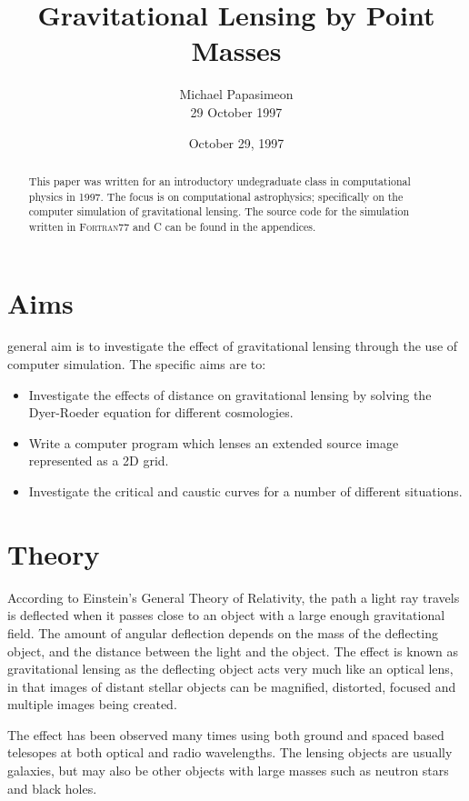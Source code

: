 \documentclass[a4paper]{IEEEtran}
\title{Gravitational Lensing by Point Masses}
\author{Michael Papasimeon\\29 October 1997}
\date{October 29, 1997}
\begin{document}
\maketitle

\begin{abstract} 
This paper was written for an introductory undegraduate class in computational physics in 1997. 
The focus is on computational astrophysics; specifically on the computer simulation of gravitational
lensing. The source code for the simulation written in \textsc{Fortran77} and \textsc{C} can be found 
in the appendices. 
\end{abstract} 

\section{Aims}
general aim is to investigate the effect of gravitational lensing through the 
use of computer simulation. The specific aims are to:
\begin{itemize}
    \item Investigate the effects of distance on gravitational lensing
          by solving the Dyer-Roeder equation for different cosmologies.
    \item Write a computer program which lenses an extended source image 
          represented as a 2D grid. 
    \item Investigate the critical and caustic curves for a number of different
          situations.
\end{itemize}

\section{Theory}
According to Einstein's General Theory of Relativity, the path a light
ray travels is deflected when it passes close to an object with a large
enough gravitational field. The amount of angular deflection depends on
the mass of the deflecting object, and the distance between the light and
the object. The effect is known as gravitational lensing as the deflecting
object acts very much like an optical lens, in that images of distant
stellar objects can be magnified, distorted, focused and multiple
images being created.

The effect has been observed many times using both ground and spaced
based telesopes at both optical and radio wavelengths. The lensing objects
are usually galaxies, but may also be other objects with large masses
such as neutron stars and black holes. 
\end{document}
